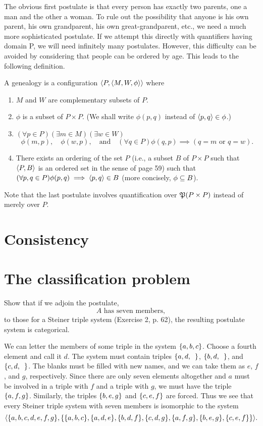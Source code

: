\documentclass{report}
\renewcommand*{\lor}{\text{ or }}
\begin{document}
\begin{solution}
The obvious first postulate is that every person has exactly two parents, one a man
and the other a woman. To rule out the possibility that anyone is his own parent, his own
grandparent, his own great-grandparent, etc., we need a much more sophisticated postulate.
If we attempt this directly with quantifiers having domain P, we will need infinitely
many postulates. However, this difficulty can be avoided by considering that people can
be ordered by age. This leads to the following definition.

A genealogy is a configuration $\left\langle P,\left\langle M, W,\phi\right\rangle\right\rangle$ where
\begin{enumerate}[label=(\roman*)]
    \item $M$ and $W$ are complementary subsets of $P$.
    \item $\phi$ is a subset of $P\times P$. (We shall write $\phi(p,q)$ instead of $\left\langle p,q\right\rangle\in\phi$.)
    \item $(\forall p\in P)(\exists m\in M)(\exists w\in W)$
        \[\phi(m, p),\quad \phi(w,p),\quad\text{and}\quad (\forall q\in P)\phi(q,p)\implies(q=m\lor q=w).\]
    \item There exists an ordering of the set $P$ (i.e., a subset $B$ of $P \times P$ such that $\left\langle P,B\right\rangle$
        is an ordered set in the sense of page 59) such that $(\forall p,q\in P)\phi(p,q)\implies\left\langle p,q\right\rangle\in B$
        (more concisely, $\phi\subseteq B$).
\end{enumerate}
Note that the last postulate involves quantification over $\operatorname{\mathfrak{P}}(P\times P)$ instead of merely
over $P$.
\end{solution}
\section{Consistency}

\section{The classification problem}
\begin{exercise}
Show that if we adjoin the postulate,
\[\text{$A$ has seven members},\]
to those for a Steiner triple system (Exercise 2, p. 62), the resulting postulate system is
categorical.
\end{exercise}

\begin{solution}
We can letter the members of some triple in the system $\left\{a, b, c\right\}$. Choose a fourth
element and call it $d$. The system must contain triples
$\left\{a,d,\enspace\right\}$, $\left\{b,d,\enspace\right\}$, and $\left\{c,d,\enspace\right\}$.
The blanks must be filled with new names, and we can take them as $e$, $f$, and $g$, respectively.
Since there are only seven elements altogether and $a$ must be involved in a triple
with $f$ and a triple with $g$, we must have the triple $\left\{a, f, g\right\}$. Similarly, the triples $\left\{b,e,g\right\}$
and $\left\{c,e,f\right\}$ are forced. Thus we see that every Steiner triple system with seven members
is isomorphic to the system
\[\aprn{\set{a,b,c,d,e,f,g},\set{\set{a,b,c},\set{a,d,e},\set{b,d,f},\set{c,d,g},\set{a,f,g},\set{b,e,g},\set{c,e,f}}}.\]
\end{solution}
\end{document}
